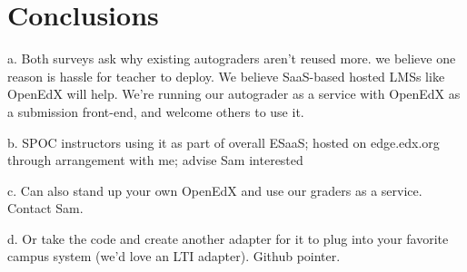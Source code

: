 \section{Conclusions}



a.	Both surveys ask why existing autograders aren't reused more.
we believe one reason is hassle for teacher to deploy. We believe SaaS-based hosted LMSs like OpenEdX will help. We're running our autograder as a service with OpenEdX as a submission front-end, and welcome others to use it.

b.	SPOC instructors using it as part of overall ESaaS; hosted on edge.edx.org through arrangement with me; advise Sam interested

c.	Can also stand up your own OpenEdX and use our graders as a service. Contact Sam.

d.	Or take the code and create another adapter for it to plug into your favorite campus system (we'd love an LTI adapter).  Github pointer.



